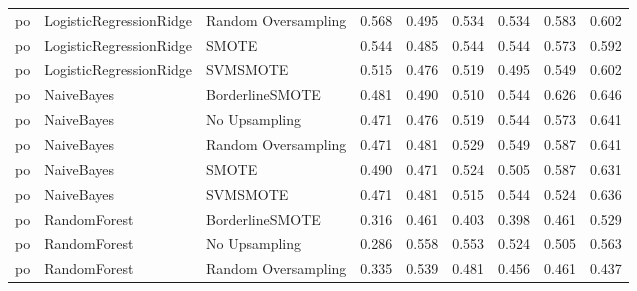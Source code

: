 \begin{tabular}{lllllllll}
      po &      LogisticRegressionRidge & Random Oversampling &     0.568 &                     0.495 &                 0.534 &                  0.534 &                                   0.583 &     0.602 \\
      po &      LogisticRegressionRidge &               SMOTE &     0.544 &                     0.485 &                 0.544 &                  0.544 &                                   0.573 &     0.592 \\
      po &      LogisticRegressionRidge &            SVMSMOTE &     0.515 &                     0.476 &                 0.519 &                  0.495 &                                   0.549 &     0.602 \\
      po &                   NaiveBayes &     BorderlineSMOTE &     0.481 &                     0.490 &                 0.510 &                  0.544 &                                   0.626 &     0.646 \\
      po &                   NaiveBayes &       No Upsampling &     0.471 &                     0.476 &                 0.519 &                  0.544 &                                   0.573 &     0.641 \\
      po &                   NaiveBayes & Random Oversampling &     0.471 &                     0.481 &                 0.529 &                  0.549 &                                   0.587 &     0.641 \\
      po &                   NaiveBayes &               SMOTE &     0.490 &                     0.471 &                 0.524 &                  0.505 &                                   0.587 &     0.631 \\
      po &                   NaiveBayes &            SVMSMOTE &     0.471 &                     0.481 &                 0.515 &                  0.544 &                                   0.524 &     0.636 \\
      po &                 RandomForest &     BorderlineSMOTE &     0.316 &                     0.461 &                 0.403 &                  0.398 &                                   0.461 &     0.529 \\
      po &                 RandomForest &       No Upsampling &     0.286 &                     0.558 &                 0.553 &                  0.524 &                                   0.505 &     0.563 \\
      po &                 RandomForest & Random Oversampling &     0.335 &                     0.539 &                 0.481 &                  0.456 &                                   0.461 &     0.437 \\

\end{tabular}
